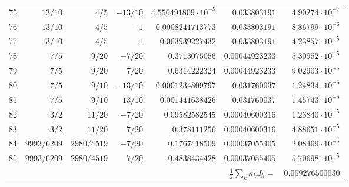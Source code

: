 \documentclass[11pt,reqno]{amsart}
\numberwithin{equation}{section}
\theoremstyle{definition}
\theoremstyle{remark}
\begin{document}
\begin{center}
\begin{longtable}{@{}rrrrrrr@{}}
75 & $13/10$ & $4/5$ & $-13/10$ & $4.556491809\cdot10^{-5}$ & $0.033803191$ & $4.90274\cdot10^{-7}$\\
76 & $13/10$ & $4/5$ & $-1$ & $0.0008241713773$ & $0.033803191$ & $8.86799\cdot10^{-6}$\\
77 & $13/10$ & $4/5$ & $1$ & $0.003939227432$ & $0.033803191$ & $4.23857\cdot10^{-5}$\\
78 & $7/5$ & $9/20$ & $-7/20$ & $0.3713075056$ & $0.00044923233$ & $5.30952\cdot10^{-5}$\\
79 & $7/5$ & $9/20$ & $7/20$ & $0.6314222324$ & $0.00044923233$ & $9.02903\cdot10^{-5}$\\
80 & $7/5$ & $9/10$ & $-13/10$ & $0.0001234809797$ & $0.031760037$ & $1.24834\cdot10^{-6}$\\
81 & $7/5$ & $9/10$ & $13/10$ & $0.001441638426$ & $0.031760037$ & $1.45743\cdot10^{-5}$\\
82 & $3/2$ & $11/20$ & $-7/20$ & $0.09582582545$ & $0.00040600316$ & $1.23840\cdot10^{-5}$\\
83 & $3/2$ & $11/20$ & $7/20$ & $0.378111256$ & $0.00040600316$ & $4.88651\cdot10^{-5}$\\
84 & $9993/6209$ & $2980/4519$ & $-7/20$ & $0.1767418509$ & $0.00037055405$ & $2.08469\cdot10^{-5}$\\
85 & $9993/6209$ & $2980/4519$ & $7/20$ & $0.4838434428$ & $0.00037055405$ & $5.70698\cdot10^{-5}$\\
\midrule \multicolumn{6}{r}{$\frac1\pi\sum_k\kappa_kJ_k=$} & $0.009276500030$\\
\end{longtable}
\end{center}
\end{document}
